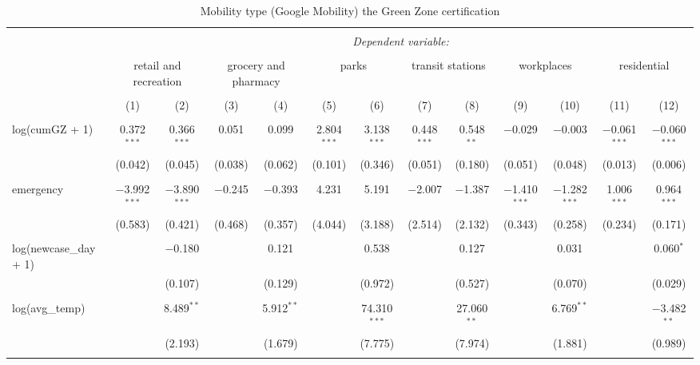 
\begin{sidewaystable}[!htbp] \centering 
  \caption{Mobility type (Google Mobility) the Green Zone certification} 
  \label{} 
\begin{tabular}{@{\extracolsep{-25pt}}lcccccccccccc} 
\\[-1.8ex]\hline 
\hline \\[-1.8ex] 
 & \multicolumn{12}{c}{\textit{Dependent variable:}} \\ 
\cline{2-13} 
\\[-1.8ex] & \multicolumn{2}{c}{retail and recreation} & \multicolumn{2}{c}{grocery and pharmacy} & \multicolumn{2}{c}{parks} & \multicolumn{2}{c}{transit stations} & \multicolumn{2}{c}{workplaces} & \multicolumn{2}{c}{residential} \\ 
\\[-1.8ex] & (1) & (2) & (3) & (4) & (5) & (6) & (7) & (8) & (9) & (10) & (11) & (12)\\ 
\hline \\[-1.8ex] 
 log(cumGZ + 1) & 0.372$^{***}$ & 0.366$^{***}$ & 0.051 & 0.099 & 2.804$^{***}$ & 3.138$^{***}$ & 0.448$^{***}$ & 0.548$^{**}$ & $-$0.029 & $-$0.003 & $-$0.061$^{***}$ & $-$0.060$^{***}$ \\ 
  & (0.042) & (0.045) & (0.038) & (0.062) & (0.101) & (0.346) & (0.051) & (0.180) & (0.051) & (0.048) & (0.013) & (0.006) \\ 
  & & & & & & & & & & & & \\ 
 emergency & $-$3.992$^{***}$ & $-$3.890$^{***}$ & $-$0.245 & $-$0.393 & 4.231 & 5.191 & $-$2.007 & $-$1.387 & $-$1.410$^{***}$ & $-$1.282$^{***}$ & 1.006$^{***}$ & 0.964$^{***}$ \\ 
  & (0.583) & (0.421) & (0.468) & (0.357) & (4.044) & (3.188) & (2.514) & (2.132) & (0.343) & (0.258) & (0.234) & (0.171) \\ 
  & & & & & & & & & & & & \\ 
 log(newcase\_day + 1) &  & $-$0.180 &  & 0.121 &  & 0.538 &  & 0.127 &  & 0.031 &  & 0.060$^{*}$ \\ 
  &  & (0.107) &  & (0.129) &  & (0.972) &  & (0.527) &  & (0.070) &  & (0.029) \\ 
  & & & & & & & & & & & & \\ 
 log(avg\_temp) &  & 8.489$^{**}$ &  & 5.912$^{**}$ &  & 74.310$^{***}$ &  & 27.060$^{**}$ &  & 6.769$^{**}$ &  & $-$3.482$^{**}$ \\ 
  &  & (2.193) &  & (1.679) &  & (7.775) &  & (7.974) &  & (1.881) &  & (0.989) \\ 
  & & & & & & & & & & & & \\ 

\end{tabular}
\end{sidewaystable}

